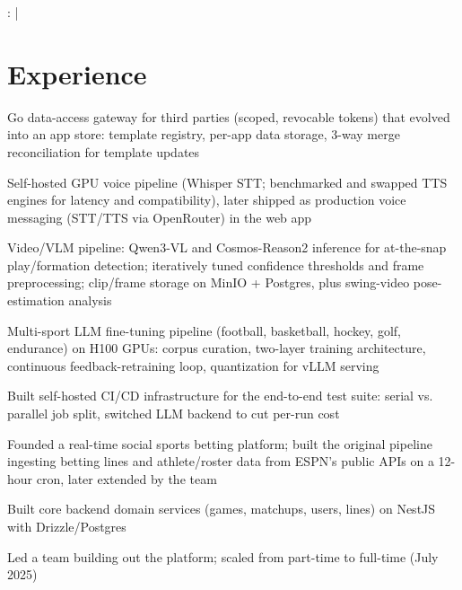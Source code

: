 \documentclass[print]{jack-resume}
\begin{document}
\raggedright{
    :
      \href{https://www.linkedin.com/in/jack-sturtevant/}{ \ExternalLink} |
     \href{https://github.com/jacksturt}{ \ExternalLink}}


\section{Experience}

\begin{tightemize}
    \item Go data-access gateway for third parties (scoped, revocable tokens) that evolved into an app store: template registry, per-app data storage, 3-way merge reconciliation for template updates
    \item Self-hosted GPU voice pipeline (Whisper STT; benchmarked and swapped TTS engines for latency and compatibility), later shipped as production voice messaging (STT/TTS via OpenRouter) in the web app
    \item Video/VLM pipeline: Qwen3-VL and Cosmos-Reason2 inference for at-the-snap play/formation detection; iteratively tuned confidence thresholds and frame preprocessing; clip/frame storage on MinIO + Postgres, plus swing-video pose-estimation analysis
    \item Multi-sport LLM fine-tuning pipeline (football, basketball, hockey, golf, endurance) on H100 GPUs: corpus curation, two-layer training architecture, continuous feedback-retraining loop, quantization for vLLM serving
    \item Built self-hosted CI/CD infrastructure for the end-to-end test suite: serial vs. parallel job split, switched LLM backend to cut per-run cost
\end{tightemize}
\sectionsep

\begin{tightemize}
    \item Founded a real-time social sports betting platform; built the original pipeline ingesting betting lines and athlete/roster data from ESPN's public APIs on a 12-hour cron, later extended by the team
    \item Built core backend domain services (games, matchups, users, lines) on NestJS with Drizzle/Postgres
    \item Led a team building out the platform; scaled from part-time to full-time (July 2025)
\end{tightemize}
\sectionsep
\end{document}
